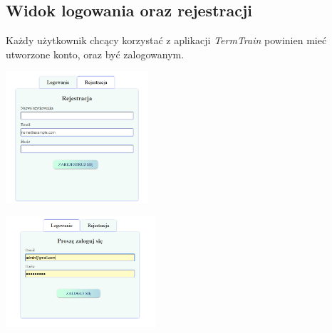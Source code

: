 \documentclass[10pt,a4paper]{report}
\begin{document}
\begin{adjustwidth}{2cm}{2cm}
\subsection{Widok logowania oraz rejestracji}
\begin{minipage}{1\linewidth}
Każdy użytkownik chcący korzystać z aplikacji \textit{TermTrain} powinien mieć utworzone konto, oraz być zalogowanym.
\end{minipage}
\begin{multicols}{2}
\begin{minipage}{\linewidth}
  \includegraphics[width=200px]{project/rejestracja.png}
\end{minipage}

\begin{minipage}{\linewidth}
  \includegraphics[width=210px]{project/logowanie.png}
\end{minipage}
\end{multicols}

\end{adjustwidth}
\end{document}
